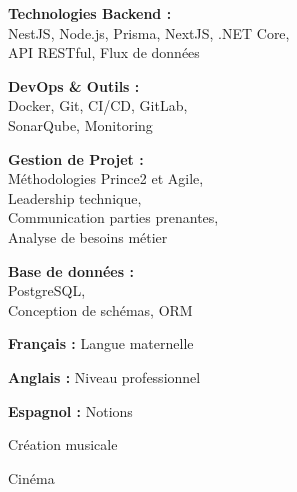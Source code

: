 \documentclass[a4paper,11pt]{article}
\begin{document}
\begin{cv}[profile][2]
    \cvseparator[2]
    \begin{cvitem}
        \textbf{Technologies Backend :} \\
        NestJS, Node.js, Prisma, NextJS, .NET Core, \\
        API RESTful, Flux de données
    \end{cvitem}

    \cvseparator[2]
    \begin{cvitem}
        \textbf{DevOps \& Outils :} \\
        Docker, Git, CI/CD, GitLab, \\
        SonarQube, Monitoring
    \end{cvitem}

    \cvseparator[2]
    \begin{cvitem}
        \textbf{Gestion de Projet :} \\
        Méthodologies Prince2 et Agile, \\
        Leadership technique, \\
        Communication parties prenantes, \\
        Analyse de besoins métier
    \end{cvitem}

    \cvseparator[2]
    \begin{cvitem}
        \textbf{Base de données :} \\
        PostgreSQL, \\
        Conception de schémas, ORM
    \end{cvitem}

\begin{cvitem}
    \textbf{Français :} Langue maternelle
\end{cvitem}

\cvseparator
\begin{cvitem}
    \textbf{Anglais :} Niveau professionnel
\end{cvitem}

\cvseparator
\begin{cvitem}
    \textbf{Espagnol :} Notions
\end{cvitem}

\begin{cvitem}
    Création musicale
\end{cvitem}

\cvseparator
\begin{cvitem}
    Cinéma
\end{cvitem}


\end{cv}
\end{document}
